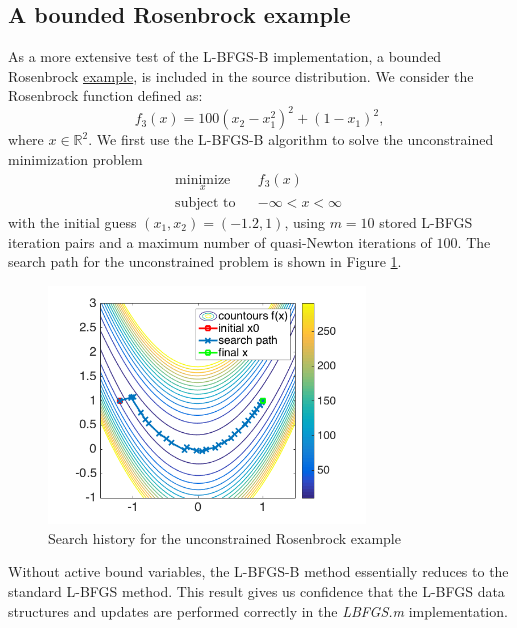 \documentclass[11pt]{article}
\begin{document}
\subsection{A bounded Rosenbrock example}

As a more extensive test of the L-BFGS-B implementation,
a bounded Rosenbrock
\href{https://github.com/bgranzow/L-BFGS-B/blob/master/test_rosenbrock.m}
{example}, is included in the source distribution.
We consider the Rosenbrock function defined as:
%
\begin{equation}
f_3(x) = 100(x_2-x_1^2)^2 + (1-x_1)^2,
\end{equation}
%
where $x \in \mathbb{R}^2$.
We first use the L-BFGS-B algorithm to solve the
unconstrained minimization problem
%
\begin{equation}
\begin{aligned}
& \underset{x}{\text{minimize}}
& & f_3(x) \\
& \text{subject to}
& & -\infty < x < \infty  \quad
\end{aligned}
\end{equation}
%
with the initial guess $(x_1,x_2) = (-1.2, 1)$, using
$m=10$ stored L-BFGS iteration pairs and a maximum
number of quasi-Newton iterations of $100$.
The search path for the unconstrained problem is
shown in Figure \ref{fig:rosenbrock_unconstrained}.
%
\begin{figure}[hbt!]
\centering
\includegraphics[width=0.75\textwidth]{rosenbrock_unbounded}
\caption{Search history for the unconstrained Rosenbrock example}
\label{fig:rosenbrock_unconstrained}
\end{figure}
%
Without active bound variables, the L-BFGS-B method essentially
reduces to the standard L-BFGS method. This result gives us
confidence that the L-BFGS data structures and updates
are performed correctly in the \emph{LBFGS.m} implementation.
\end{document}
